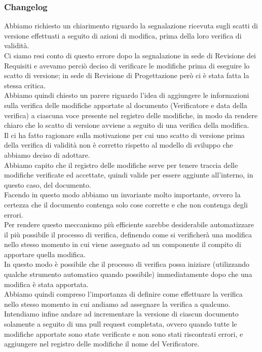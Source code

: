 	\subsubsection*{Changelog}
	Abbiamo richiesto un chiarimento riguardo la segnalazione ricevuta sugli scatti di versione effettuati a seguito di azioni di modifica, prima della loro verifica di validità. \\
	Ci siamo resi conto di questo errore dopo la segnalazione in sede di Revisione dei Requisiti e avevamo perciò deciso di verificare le modifiche prima di eseguire lo scatto di versione; in sede di Revisione di Progettazione però ci è stata fatta la stessa critica. \\
	Abbiamo quindi chiesto un parere riguardo l'idea di aggiungere le informazioni sulla verifica delle modifiche apportate al documento (Verificatore e data della verifica) a ciascuna voce presente nel registro delle modifiche, in modo da rendere chiaro che lo scatto di versione avviene a seguito di una verifica della modifica. \\
	Il \TV{} ci ha fatto ragionare sulla motivazione per cui uno scatto di versione prima della verifica di validità non è corretto rispetto al modello di sviluppo che abbiamo deciso di adottare. \\
	Abbiamo capito che il registro delle modifiche serve per tenere traccia delle modifiche verificate ed accettate, quindi valide per essere aggiunte all'interno, in questo caso, del documento. \\
	Facendo in questo modo abbiamo un invariante molto importante, ovvero la certezza che il documento contenga solo cose corrette e che non contenga degli errori. \\
	Per rendere questo meccanismo più efficiente sarebbe desiderabile automatizzare il più possibile il processo di verifica, definendo come si verificherà una modifica nello stesso momento in cui viene assegnato ad un componente il compito di apportare quella modifica. \\
	In questo modo è possibile che il processo di verifica possa iniziare (utilizzando qualche strumento automatico quando possibile) immediatamente dopo che una modifica è stata apportata. \\
	Abbiamo quindi compreso l'importanza di definire come effettuare la verifica nello stesso momento in cui andiamo ad assegnare la verifica a qualcuno. \\
	Intendiamo infine andare ad incrementare la versione di ciascun documento solamente a seguito di una pull request completata, ovvero quando tutte le modifiche apportate sono state verificate e non sono stati riscontrati errori, e aggiungere nel registro delle modifiche il nome del Verificatore.

	
	
	